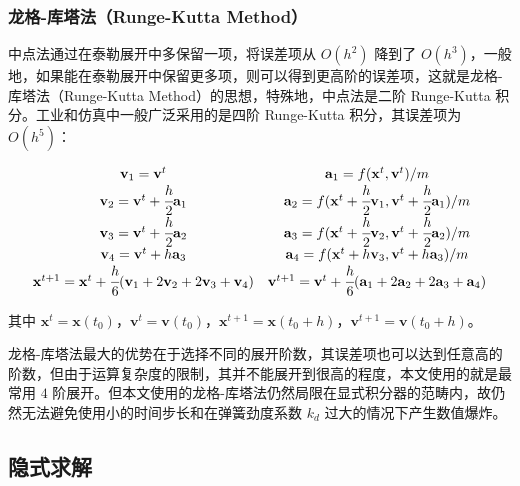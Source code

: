 \documentclass[UTF8]{ctexart}
\begin{document}
\subsubsection{龙格-库塔法（Runge-Kutta Method）}

中点法通过在泰勒展开中多保留一项，将误差项从 $O(h^2)$ 降到了 $O(h^3)$，一般地，如果能在泰勒展开中保留更多项，则可以得到更高阶的误差项，这就是龙格-库塔法（Runge-Kutta Method）的思想，特殊地，中点法是二阶 Runge-Kutta 积分。工业和仿真中一般广泛采用的是四阶 Runge-Kutta 积分，其误差项为 $O(h^5)$：

\begin{large}
\begin{equation}
\begin{matrix}
\mathbf{v}_1 = \mathbf{v}^t & \mathbf{a}_1 = f(\mathbf{x}^t, \mathbf{v}^t) / m \\
\mathbf{v}_2 = \mathbf{v}^t + \cfrac{h}{2} \mathbf{a}_1 & \mathbf{a}_2 = f(\mathbf{x}^t + \cfrac{h}{2} \mathbf{v}_1, \mathbf{v}^t + \cfrac{h}{2} \mathbf{a}_1) / m \\
\mathbf{v}_3 = \mathbf{v}^t + \cfrac{h}{2} \mathbf{a}_2 & \mathbf{a}_3 = f(\mathbf{x}^t + \cfrac{h}{2} \mathbf{v}_2, \mathbf{v}^t + \cfrac{h}{2} \mathbf{a}_2) / m \\
\mathbf{v}_4 = \mathbf{v}^t + h \mathbf{a}_3 & \mathbf{a}_4 = f(\mathbf{x}^t + h \mathbf{v}_3, \mathbf{v}^t + h \mathbf{a}_3) / m \\
\mathbf{x}^{t+1} = \mathbf{x}^{t} + \cfrac{h}{6}(\mathbf{v}_1 + 2\mathbf{v}_2 + 2\mathbf{v}_3 + \mathbf{v}_4)
& \mathbf{v}^{t+1} = \mathbf{v}^{t} + \cfrac{h}{6}(\mathbf{a}_1 + 2\mathbf{a}_2 + 2\mathbf{a}_3 + \mathbf{a}_4)
\end{matrix}
\end{equation}
\end{large}

其中 $\mathbf{x}^t = \mathbf{x}(t_0)$，$\mathbf{v}^t = \mathbf{v}(t_0)$，$\mathbf{x}^{t+1} = \mathbf{x}(t_0 + h)$，$\mathbf{v}^{t+1} = \mathbf{v}(t_0 + h)$。

龙格-库塔法最大的优势在于选择不同的展开阶数，其误差项也可以达到任意高的阶数，但由于运算复杂度的限制，其并不能展开到很高的程度，本文使用的就是最常用 $4$ 阶展开。但本文使用的龙格-库塔法仍然局限在显式积分器的范畴内，故仍然无法避免使用小的时间步长和在弹簧劲度系数 $k_d$ 过大的情况下产生数值爆炸。

\subsection{隐式求解}
\end{document}
